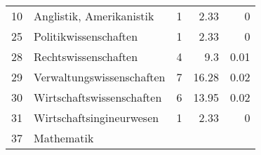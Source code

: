 \begin{longtable}{lXrrr}
     10 &
     \multicolumn{1}{X}{ Anglistik, Amerikanistik   } &


       \num{1} &
       \num[round-mode=places,round-precision=2]{2,33} &
         \num[round-mode=places,round-precision=2]{0} \\

     25 &
     \multicolumn{1}{X}{ Politikwissenschaften   } &


       \num{1} &
       \num[round-mode=places,round-precision=2]{2,33} &
         \num[round-mode=places,round-precision=2]{0} \\

     28 &
     \multicolumn{1}{X}{ Rechtswissenschaften   } &


       \num{4} &
       \num[round-mode=places,round-precision=2]{9,3} &
         \num[round-mode=places,round-precision=2]{0,01} \\

     29 &
     \multicolumn{1}{X}{ Verwaltungswissenschaften   } &


       \num{7} &
       \num[round-mode=places,round-precision=2]{16,28} &
         \num[round-mode=places,round-precision=2]{0,02} \\

     30 &
     \multicolumn{1}{X}{ Wirtschaftswissenschaften   } &


       \num{6} &
       \num[round-mode=places,round-precision=2]{13,95} &
         \num[round-mode=places,round-precision=2]{0,02} \\

     31 &
     \multicolumn{1}{X}{ Wirtschaftsingineurwesen   } &


       \num{1} &
       \num[round-mode=places,round-precision=2]{2,33} &
         \num[round-mode=places,round-precision=2]{0} \\

     37 &
     \multicolumn{1}{X}{ Mathematik   } &



\end{longtable}
